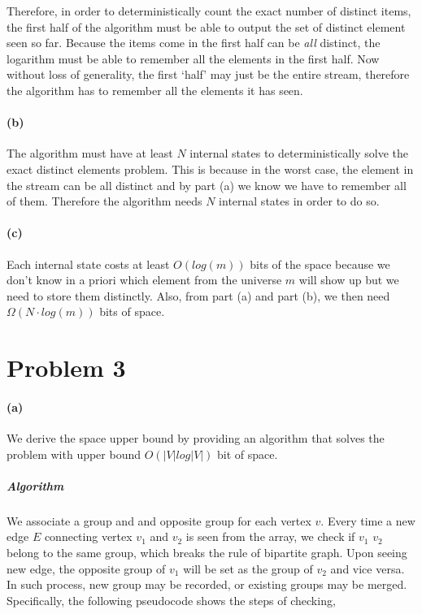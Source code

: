 \documentclass[12pt]{article}
\begin{document}
Therefore, in order to deterministically count the exact number of distinct items, the first half of the algorithm must be able to output the set of distinct element seen so far. Because the items come in the first half can be \emph{all} distinct, the logarithm must be able to remember all the elements in the first half. Now without loss of generality, the first `half' may just be the entire stream, therefore the algorithm has to remember all the elements it has seen. 

\paragraph{(b)} The algorithm must have at least $N$ internal states to deterministically solve the exact distinct elements problem. This is because in the worst case, the element in the stream can be all distinct and by part (a) we know we have to remember all of them. Therefore the algorithm needs $N$ internal states in order to do so. 

\paragraph{(c)} Each internal state costs at least $O(log(m))$ bits of the space because we don't know in a priori which element from the universe $m$ will show up but we need to store them distinctly. Also, from part (a) and part (b), we then need $\Omega(N \cdot log(m))$ bits of space.

\pagebreak

\section*{Problem 3} 
\paragraph{(a)} We derive the space upper bound by providing an algorithm that solves the problem with upper bound $O(|V|log|V|)$ bit of space.

\subparagraph{Algorithm} We associate a group and and opposite group for each vertex $v$. Every time a new edge $E$ connecting vertex $v_1$ and $v_2$ is seen from the array, we check if $v_1$ $v_2$ belong to the same group, which breaks the rule of bipartite graph. Upon seeing new edge, the opposite group of $v_1$ will be set as the group of $v_2$ and vice versa. In such process, new group may be recorded, or existing groups may be merged. Specifically, the following pseudocode shows the steps of checking, 
\end{document}
